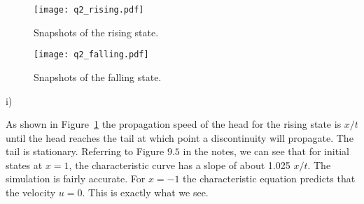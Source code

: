 \documentclass{article}
\begin{document}
\begin{homeworkProblem}
    
    \begin{figure}[!ht]
    \begin{center}
        
        \texttt{[image: q2\_rising.pdf]}

        \caption{\label{fig:q2_rising} Snapshots of the rising state.}

    \end{center}
    \end{figure}

    \begin{figure}[!ht]
    \begin{center}
        
        \texttt{[image: q2\_falling.pdf]}

        \caption{\label{fig:q2_falling} Snapshots of the falling state.}

    \end{center}
    \end{figure}

    \begin{homeworkSection}{i)}
    
        As shown in Figure~\ref{fig:q2_rising} the propagation speed of the
        head for the rising state is $x/t$ until the head reaches the tail at
        which point a discontinuity will propagate.  The tail is stationary.
        Referring to Figure $9.5$ in the notes, we can see that for initial
        states at $x = 1$, the characteristic curve has a slope of about 1.025
        $x/t$. The simulation is fairly accurate. For $x = -1$ the
        characteristic equation predicts that the velocity $u = 0$. This is
        exactly what we see.

    \end{homeworkSection}
    

\end{homeworkProblem}
\end{document}
